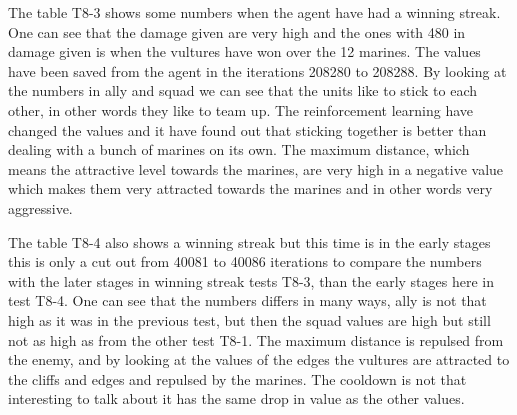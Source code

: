 
The table T8-3 shows some numbers when the agent have had a winning streak. One can see that the damage given are very high and the ones with 480 in damage given is when the vultures have won over the 12 marines. The values have been saved from the agent in the iterations 208280 to 208288. By looking at the numbers in ally and squad we can see that the units like to stick to each other, in other words they like to team up. The reinforcement learning have changed the values and it have found out that sticking together is better than dealing with a bunch of marines on its own. The maximum distance, which means the attractive level towards the marines, are very high in a negative value which makes them very attracted towards the marines and in other words very aggressive. 



The table T8-4 also shows a winning streak but this time is in the early stages this is only a cut out from 40081 to 40086 iterations to compare the numbers with the later stages in winning streak tests T8-3, than the early stages here in test T8-4. One can see that the numbers differs in many ways, ally is not that high as it was in the previous test, but then the squad values are high but still not as high as from the other test T8-1. The maximum distance is repulsed from the enemy, and by looking at the values of the edges the vultures are attracted to the cliffs and edges and repulsed by the marines. The cooldown is not that interesting to talk about it has the same drop in value as the other values.
